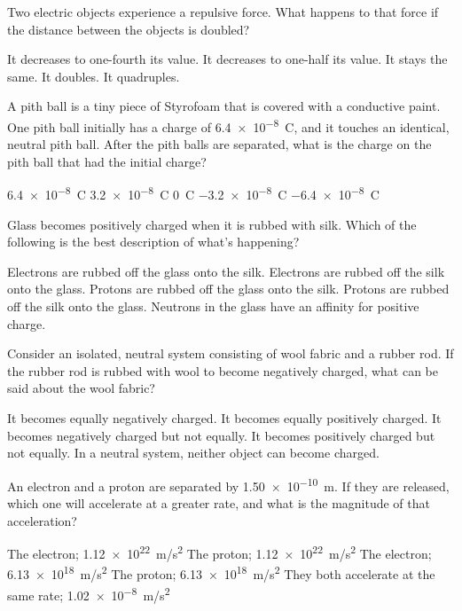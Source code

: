 \documentclass{../../../oss-ap12ibhl}
\begin{document}
\genheader


\begin{questions}

  \question Two electric objects experience a repulsive force. What happens
  to that force if the distance between the objects is doubled?
  \begin{choices}
    \choice It decreases to one-fourth its value.
    \choice It decreases to one-half its value.
    \choice It stays the same.
    \choice It doubles.
    \choice It quadruples.
  \end{choices}
    
  \question A pith ball is a tiny piece of Styrofoam that is covered with a
  conductive paint. One pith ball initially has a charge of
  \SI{6.4e-8}{\coulomb}, and it touches an identical, neutral pith ball. After
  the pith balls are separated, what is the charge on the pith ball that had
  the initial charge?
  \begin{choices}
    \choice\SI{6.4e-8}{\coulomb}
    \choice\SI{3.2e-8}{\coulomb}
    \choice\SI{0}{\coulomb}
    \choice\SI{-3.2e-8}{\coulomb}
    \choice\SI{-6.4e-8}{\coulomb}
  \end{choices}

  \question Glass becomes positively charged when it is rubbed with silk. Which
  of the following is the best description of what's happening?
  \begin{choices}
    \choice Electrons are rubbed off the glass onto the silk.
    \choice Electrons are rubbed off the silk onto the glass.
    \choice Protons are rubbed off the glass onto the silk.
    \choice Protons are rubbed off the silk onto the glass.
    \choice Neutrons in the glass have an affinity for positive charge.
  \end{choices}

  \question Consider an isolated, neutral system consisting of wool fabric and a
  rubber rod. If the rubber rod is rubbed with wool to become negatively
  charged, what can be said about the wool fabric?
  \begin{choices}
    \choice It becomes equally negatively charged.
    \choice It becomes equally positively charged.
    \choice It becomes negatively charged but not equally.
    \choice It becomes positively charged but not equally.
    \choice In a neutral system, neither object can become charged.
  \end{choices}

  \question An electron and a proton are separated by \SI{1.50e-10}{\metre}. If
  they are released, which one will accelerate at a greater rate, and what is
  the magnitude of that acceleration?
  \begin{choices}
    \choice The electron; \SI{1.12e22}{m/s^2}
    \choice The proton; \SI{1.12e22}{m/s^2}
    \choice The electron; \SI{6.13e18}{m/s^2}
    \choice The proton; \SI{6.13e18}{m/s^2}
    \choice They both accelerate at the same rate; \SI{1.02e-8}{m/s^2}
  \end{choices}


\end{questions}
\end{document}

